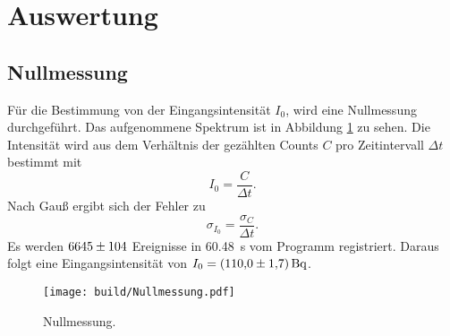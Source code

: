 \newpage
\section{Auswertung}
\label{sec:Auswertung}
\subsection{Nullmessung}
Für die Bestimmung von der Eingangsintensität $I_0$, wird eine Nullmessung durchgeführt.
Das aufgenommene Spektrum ist in Abbildung \ref{fig:Nullmessung} zu sehen.
Die Intensität wird aus dem Verhältnis der gezählten Counts $C$ pro Zeitintervall $\Delta t$ bestimmt mit
\begin{equation}
    I_0=\frac{C}{\Delta t}.
\end{equation}
Nach Gauß ergibt sich der Fehler zu
\begin{equation}
    \sigma_{I_0}=\frac{\sigma_C}{\Delta t}.
\end{equation}
Es werden $\num{6645\pm104}$ Ereignisse in \SI{60,48}{\second} vom Programm registriert.
Daraus folgt eine Eingangsintensität von $I_0=\SI{110.0\pm1.7}{\becquerel}$.

 \begin{figure}[htb]
   \centering
   \texttt{[image: build/Nullmessung.pdf]}
   \caption{Nullmessung.}
   \label{fig:Nullmessung}
 \end{figure}
